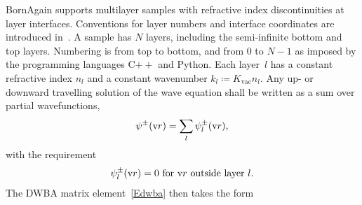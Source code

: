 BornAgain supports multilayer samples
with refractive index discontinuities at layer interfaces.
Conventions for layer numbers and interface coordinates are introduced in~.
%
%
%
%
%
%
%
%
A sample has $N$ layers,
including the semi-infinite bottom and top layers.
Numbering is from top to bottom,
and from 0 to $N-1$ as imposed by the programming languages C$++$ and Python.
Each layer~$l$
%
has a constant refractive index $n_l$
%
%
and a constant wavenumber $k_l\coloneqq K_\text{vac} n_l$.
Any up- or downward travelling solution of the wave equation shall be written
as a sum over partial wavefunctions,
\begin{equation}\label{Epsipmsuml}
  \psi^\pm(\text{v}{r}) = \sum_l \psi_l^\pm(\text{v}{r}),
\end{equation}
with the requirement
\begin{equation}\label{Epsipmloutside}
   \psi_l^\pm(\text{v}{r}) = 0 \text{~for $\text{v}{r}$ outside layer~$l$.}
\end{equation}
The DWBA matrix element~\cref{Edwba} then takes the form

